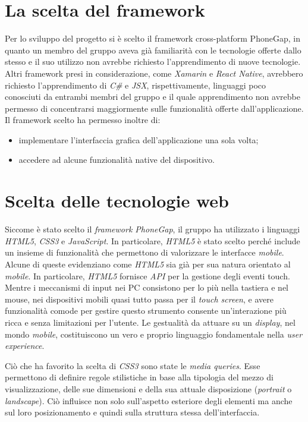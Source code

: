 \documentclass[12pt, a4paper, titlepage]{report}
\begin{document}
	\section{La scelta del framework}
	
	Per lo sviluppo del progetto si è scelto il framework cross-platform PhoneGap, in quanto un membro del gruppo aveva già familiarità con le tecnologie offerte dallo stesso e il suo utilizzo non avrebbe richiesto l'apprendimento di nuove tecnologie. Altri framework presi in considerazione, come \textit{Xamarin} e \textit{React Native}, avrebbero richiesto l'apprendimento di \textit{C\#} e \textit{JSX}, rispettivamente, linguaggi poco conosciuti da entrambi membri del gruppo e il quale apprendimento non avrebbe permesso di concentrarsi maggiormente sulle funzionalità offerte dall'applicazione. Il framework scelto ha permesso inoltre di:
	\begin{itemize}
		\item implementare l'interfaccia grafica dell'applicazione una sola volta;
		\item accedere ad alcune funzionalità native del dispositivo.
	\end{itemize}
	
	\section{Scelta delle tecnologie web}
	
	Siccome è stato scelto il \textit{framework PhoneGap}, il gruppo ha utilizzato i linguaggi \textit{HTML5}, \textit{CSS3} e \textit{JavaScript}. In particolare, \textit{HTML5} è stato scelto perché include un insieme di funzionalità che permettono di valorizzare le interfacce \textit{mobile}. Alcune di queste evidenziano come \textit{HTML5} sia già per sua natura orientato al \textit{mobile}. In particolare, \textit{HTML5} fornisce \textit{API} per la gestione degli eventi touch. Mentre i meccanismi di input nei PC consistono per lo più nella tastiera e nel mouse, nei dispositivi mobili quasi tutto passa per il \textit{touch screen}, e avere funzionalità comode per gestire questo strumento consente un'interazione più ricca e senza limitazioni per l'utente. Le gestualità da attuare su un \textit{display}, nel mondo \textit{mobile}, costituiscono un vero e proprio linguaggio fondamentale nella \textit{user experience}.
	
	Ciò che ha favorito la scelta di \textit{CSS3} sono state le \textit{media queries}. Esse permettono di definire regole stilistiche in base alla tipologia del mezzo di visualizzazione, delle sue dimensioni e della sua attuale disposizione (\textit{portrait} o \textit{landscape}). Ciò influisce non solo sull'aspetto esteriore degli elementi ma anche sul loro posizionamento e quindi sulla struttura stessa dell'interfaccia.
	\medskip
	
\end{document}

